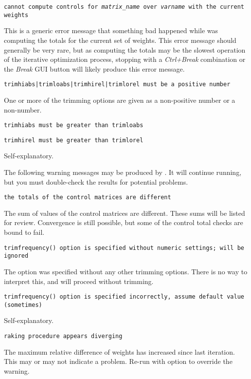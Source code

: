     \noindent
    {\tt cannot compute controls for {\it matrix{\_}name} over
    {\it varname} with the current weights}

    \morehang
    This is a generic error message that something bad happened while
     was computing the totals for the current set of weights.
    This error message should generally be very rare, but as computing 
    the totals may be the slowest operation of the iterative optimization
    process, stopping  with a {\it Ctrl+Break} combination or 
    the {\it Break} GUI button will likely produce this error message.

    \noindent
    {\tt trimhiabs|trimloabs|trimhirel|trimlorel must be a positive number}

    \morehang
    One or more of the trimming options are given as a non-positive number
    or a non-number.

    \noindent
    {\tt trimhiabs must be greater than trimloabs}

    \noindent
    {\tt trimhirel must be greater than trimlorel}

    \morehang
    Self-explanatory.

\bigskip

The following warning messages may be produced by
. It will continue running, but you must
double-check the results for potential problems.

\noindent
    {\tt the totals of the control matrices are different}

    \morehang
    The sum of values of the control matrices are different.
    These sums will be listed for review. Convergence is still
    possible, but some of the control total checks are bound to fail.

    \noindent
    {\tt trimfrequency() option is specified without numeric settings; will be ignored}

    \morehang
    The option  was specified without any other trimming options.
    There is no way to interpret this, and  will proceed without
    trimming.

    \noindent
    {\tt trimfrequency() option is specified incorrectly, assume default value (sometimes)}

    \morehang
    Self-explanatory.

    \noindent
    {\tt raking procedure appears diverging}

    \morehang
    The maximum relative difference of weights has increased since last
    iteration. This may or may not indicate a problem. Re-run 
    with  option to override the warning.

